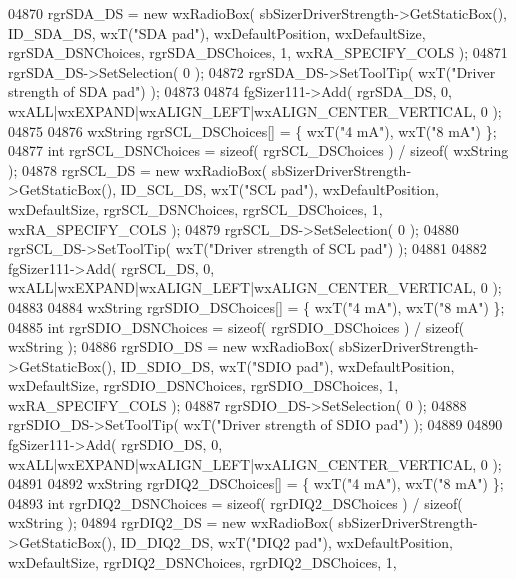 \begin{DoxyCode}
04870     rgrSDA_DS = \textcolor{keyword}{new} wxRadioBox( sbSizerDriverStrength->GetStaticBox(), ID_SDA_DS, wxT(\textcolor{stringliteral}{"SDA pad"}), 
      wxDefaultPosition, wxDefaultSize, rgrSDA\_DSNChoices, rgrSDA\_DSChoices, 1, wxRA\_SPECIFY\_COLS );
04871     rgrSDA_DS->SetSelection( 0 );
04872     rgrSDA_DS->SetToolTip( wxT(\textcolor{stringliteral}{"Driver strength of SDA pad"}) );
04873     
04874     fgSizer111->Add( rgrSDA_DS, 0, wxALL|wxEXPAND|wxALIGN\_LEFT|wxALIGN\_CENTER\_VERTICAL, 0 );
04875     
04876     wxString rgrSCL\_DSChoices[] = \{ wxT(\textcolor{stringliteral}{"4 mA"}), wxT(\textcolor{stringliteral}{"8 mA"}) \};
04877     \textcolor{keywordtype}{int} rgrSCL\_DSNChoices = \textcolor{keyword}{sizeof}( rgrSCL\_DSChoices ) / \textcolor{keyword}{sizeof}( wxString );
04878     rgrSCL_DS = \textcolor{keyword}{new} wxRadioBox( sbSizerDriverStrength->GetStaticBox(), ID_SCL_DS, wxT(\textcolor{stringliteral}{"SCL pad"}), 
      wxDefaultPosition, wxDefaultSize, rgrSCL\_DSNChoices, rgrSCL\_DSChoices, 1, wxRA\_SPECIFY\_COLS );
04879     rgrSCL_DS->SetSelection( 0 );
04880     rgrSCL_DS->SetToolTip( wxT(\textcolor{stringliteral}{"Driver strength of SCL pad"}) );
04881     
04882     fgSizer111->Add( rgrSCL_DS, 0, wxALL|wxEXPAND|wxALIGN\_LEFT|wxALIGN\_CENTER\_VERTICAL, 0 );
04883     
04884     wxString rgrSDIO\_DSChoices[] = \{ wxT(\textcolor{stringliteral}{"4 mA"}), wxT(\textcolor{stringliteral}{"8 mA"}) \};
04885     \textcolor{keywordtype}{int} rgrSDIO\_DSNChoices = \textcolor{keyword}{sizeof}( rgrSDIO\_DSChoices ) / \textcolor{keyword}{sizeof}( wxString );
04886     rgrSDIO_DS = \textcolor{keyword}{new} wxRadioBox( sbSizerDriverStrength->GetStaticBox(), 
      ID_SDIO_DS, wxT(\textcolor{stringliteral}{"SDIO pad"}), wxDefaultPosition, wxDefaultSize, rgrSDIO\_DSNChoices, rgrSDIO\_DSChoices, 1, 
      wxRA\_SPECIFY\_COLS );
04887     rgrSDIO_DS->SetSelection( 0 );
04888     rgrSDIO_DS->SetToolTip( wxT(\textcolor{stringliteral}{"Driver strength of SDIO pad"}) );
04889     
04890     fgSizer111->Add( rgrSDIO_DS, 0, wxALL|wxEXPAND|wxALIGN\_LEFT|wxALIGN\_CENTER\_VERTICAL, 0 );
04891     
04892     wxString rgrDIQ2\_DSChoices[] = \{ wxT(\textcolor{stringliteral}{"4 mA"}), wxT(\textcolor{stringliteral}{"8 mA"}) \};
04893     \textcolor{keywordtype}{int} rgrDIQ2\_DSNChoices = \textcolor{keyword}{sizeof}( rgrDIQ2\_DSChoices ) / \textcolor{keyword}{sizeof}( wxString );
04894     rgrDIQ2_DS = \textcolor{keyword}{new} wxRadioBox( sbSizerDriverStrength->GetStaticBox(), 
      ID_DIQ2_DS, wxT(\textcolor{stringliteral}{"DIQ2 pad"}), wxDefaultPosition, wxDefaultSize, rgrDIQ2\_DSNChoices, rgrDIQ2\_DSChoices, 1, 

\end{DoxyCode}
